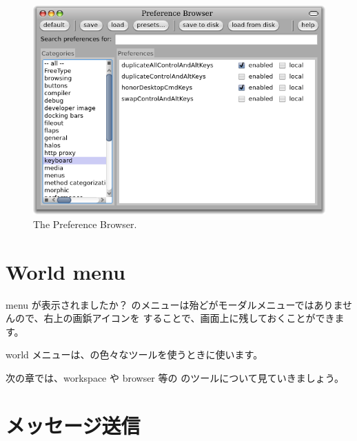 \documentclass[a4paper,10pt,twoside]{book}
\begin{document}
\begin{figure}[htb]
\centerline{\includegraphics[width=\textwidth]{PreferenceBrowser}}
\caption{The Preference Browser.}
\end{figure}


\section{World menu}

 menu が表示されましたか？
\pharo のメニューは殆どがモーダルメニューではありませんので、右上の画鋲アイコンを \click することで、画面上に残しておくことができます。

world メニューは、\pharo の色々なツールを使うときに使います。


次の章では、workspace や browser 等の \pharo のツールについて見ていきましょう。

\section{メッセージ送信}
\end{document}

